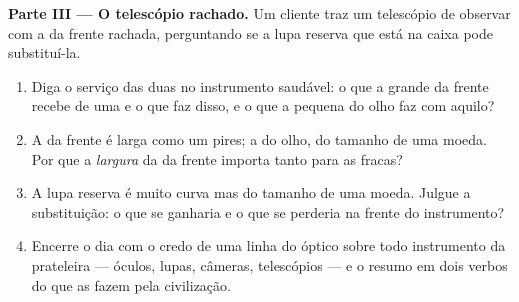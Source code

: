\begin{problem}
\medskip\noindent\textbf{Parte III --- O telescópio rachado.}
Um cliente traz um telescópio de observar  com a  da
frente rachada, perguntando se a lupa reserva que está na caixa pode
substituí-la.

\begin{enumerate}[resume]
  \item Diga o serviço das duas  no instrumento saudável: o que
        a grande  da frente recebe de uma  e o que faz
        disso, e o que a  pequena do olho faz com aquilo?
  \item A  da frente é larga como um pires; a do olho, do
        tamanho de uma moeda. Por que a \emph{largura} da  da
        frente importa tanto para as  fracas?
  \item A lupa reserva é muito curva mas do tamanho de uma moeda.
        Julgue a substituição: o que se ganharia e o que se perderia
        na frente do instrumento?
  \item Encerre o dia com o credo de uma linha do óptico sobre todo
        instrumento da prateleira --- óculos, lupas, câmeras,
        telescópios --- e o resumo em dois verbos do que as 
        fazem pela civilização.
\end{enumerate}
\end{problem}
